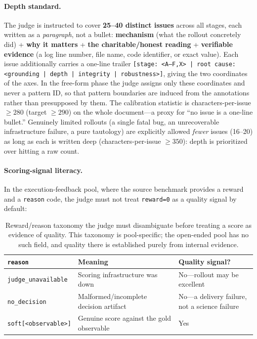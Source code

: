 \paragraph{Depth standard.} The judge is instructed to cover
\textbf{25--40 distinct issues} across all stages, each written as a
\emph{paragraph}, not a bullet: \textbf{mechanism} (what the rollout
concretely did) + \textbf{why it matters} + \textbf{the charitable/honest
reading} + \textbf{verifiable evidence} (a log line number, file name,
code identifier, or exact value). Each issue additionally carries a
one-line trailer
\texttt{[stage: <A--F,X> | root cause: <grounding | depth | integrity |
robustness>]}, giving the two coordinates of the \taxonomy axes. In the
free-form phase the judge assigns only these coordinates and never a
pattern ID, so that pattern boundaries are induced from the annotations
rather than presupposed by them. The calibration statistic is
characters-per-issue $\geq 280$ (target $\geq 290$) on the whole
document---a proxy for ``no issue is a one-line bullet.'' Genuinely limited
rollouts (a single fatal bug, an unrecoverable infrastructure failure, a
pure tautology) are explicitly allowed \emph{fewer} issues (16--20) as
long as each is written deep (characters-per-issue $\geq 350$): depth is
prioritized over hitting a raw count.

\paragraph{Scoring-signal literacy.} In the execution-feedback pool, where
the source benchmark provides a reward and a \texttt{reason} code, the
judge must not treat \texttt{reward=0} as a quality signal by default:

\begin{table}[h]
\centering
\small
\caption{Reward/reason taxonomy the judge must disambiguate before treating
a score as evidence of quality. This taxonomy is pool-specific; the
open-ended pool has no such field, and quality there is established purely
from internal evidence.}
\label{tab:rewardreason}
\begin{tabular}{lll}
\toprule
\texttt{reason} & Meaning & Quality signal? \\
\midrule
\texttt{judge\_unavailable} & Scoring infrastructure was down & No---rollout may be excellent \\
\texttt{no\_decision} & Malformed/incomplete decision artifact & No---a delivery failure, not a science failure \\
\texttt{soft[<observable>]} & Genuine score against the gold observable & Yes \\
\bottomrule
\end{tabular}

\end{table}

